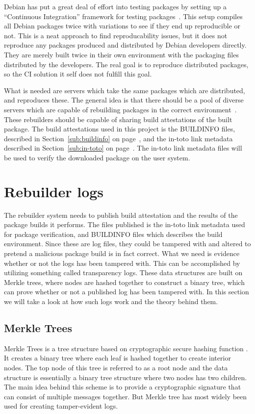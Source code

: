\documentclass[../Main/thesis.tex]{subfiles}
\begin{document}
Debian has put a great deal of effort into testing packages by setting up a
``Continuous Integration'' framework for testing packages~\cite{debian-ci}.
This setup compiles all Debian packages twice with variations to see if they end
up reproducible or not. This is a neat approach to find reproducability issues,
but it does not reproduce any packages produced and distributed by Debian
developers directly. They are merely built twice in their own environment with
the packaging files distributed by the developers. The real goal is to reproduce
distributed packages, so the CI solution it self does not fulfill this goal.

What is needed are servers which take the same packages which are distributed,
and reproduces these. The general idea is that there should be a pool of diverse
servers which are capable of rebuilding packages in the correct
environment~\cite{reproducible-builds-sharing}. These rebuilders should be
capable of sharing build attestations of the built package. The build
attestations used in this project is the BUILDINFO files, described in
Section~\ref{sub:buildinfo} on page~\pageref{sub:buildinfo}, and the in-toto
link metadata described in Section~\ref{sub:in-toto} on
page~\pageref{sub:in-toto}. The in-toto link metadata files will be used to
verify the downloaded package on the user system.

\section{Rebuilder logs}%
\label{sec:rebuilder_logs}
The rebuilder system needs to publish build attestation and the results of the
package builds it performs. The files published is the in-toto link metadata
used for package verification, and BUILDINFO files which describes the build
environment. Since these are log files, they could be tampered with and altered
to pretend a malicious package build is in fact correct. What we need is
evidence whether or not the logs has been tampered with. This can be
accomplished by utilizing something called transparency logs. These data
structures are built on Merkle trees, where nodes are hashed together to
construct a binary tree, which can prove whether or not a published log has been
tampered with. In this section we will take a look at how such logs work and the
theory behind them.

\subsection{Merkle Trees}%
\label{sec:merkle_trees}
Merkle Trees is a tree structure based on cryptographic secure hashing function
\cite{ralph-c.-merkle-1998}. It creates a binary tree where each leaf is hashed
together to create interior nodes. The top node of this tree is referred to as a
root node and the data structure is essentially a binary tree structure where
two nodes has two children. The main idea behind this scheme is to provide a
cryptographic signature that can consist of multiple messages together. But
Merkle tree has most widely been used for creating tamper-evident logs.
\end{document}
